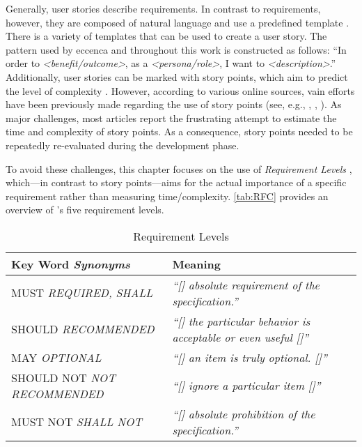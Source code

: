 Generally, user stories describe requirements. In contrast to requirements, however, they are composed of natural language and use a predefined template \parencite[see][]{Amber2014}. There is a variety of templates that can be used to create a user story. The pattern used by eccenca and throughout this work is constructed as follows: “In order to \textit{<benefit/outcome>}, as a \textit{<persona/role>}, I want to \textit{<description>}.” Additionally, user stories can be marked with story points, which aim to predict the level of complexity \parencite{Amber2014}. However, according to various online sources, vain efforts have been previously made regarding the use of story points (see, e.g., \cite{Jailall2018}, \cite{Kerievsky2012}, \cite{Krimmer2017}). As major challenges, most articles report the frustrating attempt to estimate the time and complexity of story points. As a consequence, story points needed to be repeatedly re-evaluated during the development phase.

To avoid these challenges, this chapter focuses on the use of \textit{Requirement Levels} \parencite[see][]{Bradner1997}, which---in contrast to story points---aims for the actual importance of a specific requirement rather than measuring time/complexity. \autoref{tab:RFC} provides an overview of \citeauthor{Bradner1997}’s five requirement levels.


\begin{table}[ht]
\small
\centering
\begin{tabular}{p{2.9cm}p{11.7cm}}
\toprule
Key Word \newline \footnotesize{\textit{Synonyms}} & Meaning \\
\midrule
MUST \newline \footnotesize{\textit{REQUIRED, SHALL}} & \textit{``[\textellipsis{}] absolute requirement of the specification.''} \\ \addlinespace
SHOULD \newline \footnotesize{\textit{RECOMMENDED}} & \textit{``[\textellipsis{}] the particular behavior is acceptable or even useful [\textellipsis{}]''} \\ \addlinespace
MAY \newline \footnotesize{\textit{OPTIONAL}} & \textit{``[\textellipsis{}] an item is truly optional. [\textellipsis{}]''} \\ \addlinespace %
SHOULD NOT \newline \footnotesize{\textit{NOT RECOMMENDED}} & \textit{``[\textellipsis{}] ignore a particular item [\textellipsis{}]''} \\ \addlinespace
MUST NOT \newline \footnotesize{\textit{SHALL NOT}} & \textit{``[\textellipsis{}] absolute prohibition of the specification.''} \\ \bottomrule
\end{tabular}
\caption[Requirement Levels]{Requirement Levels \parencite[1]{Bradner1997}}
\label{tab:RFC}
\end{table}

